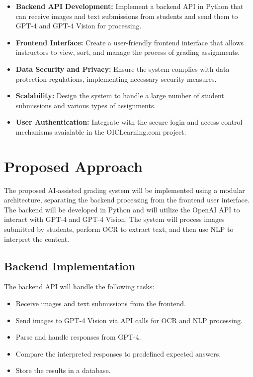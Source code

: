 \documentclass[ms,twoside,print]{nuthesis}
\begin{document}
\begin{itemize}
    \item \textbf{Backend API Development:} Implement a backend API in Python that can receive images and text submissions from students and send them to GPT-4 and GPT-4 Vision for 
    processing.
    \item \textbf{Frontend Interface:} Create a user-friendly frontend interface that allows instructors to view, sort, and manage the process of grading assignments.
    \item \textbf{Data Security and Privacy:} Ensure the system complies with data protection regulations, implementing necessary security measures.
    \item \textbf{Scalability:} Design the system to handle a large number of student submissions and various types of assignments.
    \item \textbf{User Authentication:} Integrate with the secure login and access control mechanisms avaialable in the OICLearning.com project.
\end{itemize}

\section{Proposed Approach}

The proposed AI-assisted grading system will be implemented using a modular architecture, separating the backend processing from the frontend user interface. The backend will be developed in Python and will utilize the OpenAI API to interact with GPT-4 and GPT-4 Vision. The system will process images submitted by students, perform OCR to extract text, and then use NLP to interpret the content.

\subsection{Backend Implementation}

The backend API will handle the following tasks:

\begin{itemize}
    \item Receive images and text submissions from the frontend.
    \item Send images to GPT-4 Vision via API calls for OCR and NLP processing.
    \item Parse and handle responses from GPT-4.
    \item Compare the interpreted responses to predefined expected answers. %
    \item Store the results in a database.
\end{itemize}
\end{document}
